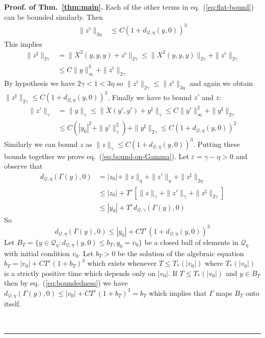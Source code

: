 \documentclass[a4paper,11pt,reqno]{article}
\newcommand{\eps}{\varepsilon}
\newcommand{\QQ}{\mathcal{Q}}
\newenvironment{proof}[1][Proof]{\textbf{#1.} }{\ \rule{0.5em}{0.5em}}
\begin{document}
\begin{proof}[Proof. of Thm.~\ref{thm:main}]
 Each of the
other terms in eq.~(\ref{eq:flat-bound}) can be bounded similarly.
 Then 
\begin{equation}
\label{eq:flat-bound-final}
  \begin{split}
\|z^{\flat}\|_{3\eta} & \le C (1+d_{\QQ,\eta}(y,0))^3
  \end{split}
\end{equation}
This implies 
\begin{equation*}
  \begin{split}
\|z^\sharp\|_{2\gamma} & = \|X^2(y,y,y) + z^\flat\|_{2\gamma}   
 \le \|X^2(y,y,y)\|_{2\gamma} + \|z^\flat\|_{2\gamma}
\\ & \le C \|y\|_{\infty}^3 + \|z^\flat\|_{2\gamma}     
  \end{split}
\end{equation*}
By hypothesis we have $2\gamma < 1 < 3\eta$ so $\|z^\flat\|_{2\gamma}
\le  \|z^\flat\|_{3\eta}$ and again we obtain
$
\|z^\sharp\|_{2\gamma} \le C (1+d_{\QQ,\eta}(y,0))^3
$.
Finally we have to bound $z'$ and $z$:
\begin{equation*}
  \begin{split}
\|z'\|_{\gamma} & = \|y\|_{\gamma} \le \|X(y',y')+y^\sharp\|_{\gamma} \le
C \|y'\|_{\infty}^2 + \|y^\sharp\|_{2\gamma}
\\  & \le
C (|y_0|^2 + \|y'\|_{\gamma}^2) + \|y^\sharp\|_{2\gamma}
\le C (1+d_{\QQ,\eta}(y,0))^2    
  \end{split}
\end{equation*}
Similarly we can bound $z$ as $\|z\|_\gamma \le C
(1+d_{\QQ,\eta}(y,0))^3$.
Putting these bounds together we prove eq.~(\ref{eq:bound-on-Gamma}).
Let $\eps = \gamma-\eta > 0$ and observe that
\begin{equation*}
  \begin{split}
    d_{\QQ,\eta}(\Gamma(y),0) &= |z_0| +
    \|z\|_\eta+\|z'\|_{\eta}+\|z^\sharp\|_{2\eta} 
\\ & \le |z_0| +
     T^\eps\left[ \|z\|_\gamma+\|z'\|_{\gamma}+\|z^\sharp\|_{2\gamma}\right]
\\ & \le |y_0| +
     T^\eps d_{\QQ,\gamma}(\Gamma(y),0)
  \end{split}
\end{equation*}
So 
\begin{equation}
\label{eq:boundedness}
    d_{\QQ,\eta}(\Gamma(y),0) \le |y_0|+ C T^\eps (1+d_{\QQ,\eta}(y,0))^3
\end{equation}
Let $B_T = \{ y \in \QQ_{\eta} : d_{\QQ,\eta}(y,0) \le b_T, y_0 = v_0
\}$ be a closed ball of elements in $\QQ_{\eta}$ with initial
condition $v_0$. Let $b_T > 0$ be the solution of the algebraic equation
$
b_T = |v_0|+ C T^\eps (1+b_T)^3
$
which exists whenever $T \le T_*(|v_0|)$ where $T_*(|v_0|)$ is a
strictly positive time which depends only on $|v_0|$. 
If $T \le T_*(|v_0|)$ and $y \in B_T$ then by eq.~(\ref{eq:boundedness}) we have
$
d_{\QQ,\eta}(\Gamma(y),0) \le |v_0| + C T^\eps (1+b_T)^3 = b_T
$    
which implies that $\Gamma$ maps $B_T$ onto itself.


\end{proof}
\end{document}
